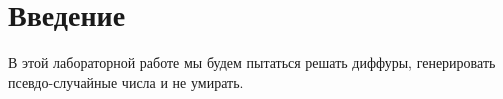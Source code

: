 \section{Введение}
    В этой лабораторной работе мы будем пытаться решать диффуры, генерировать псевдо-случайные числа и не умирать. 